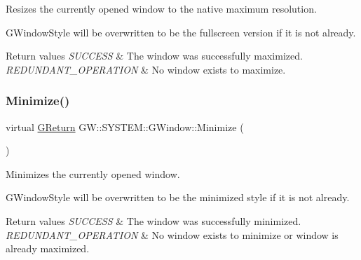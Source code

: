 Resizes the currently opened window to the native maximum resolution. 

G\+Window\+Style will be overwritten to be the fullscreen version if it is not already.


\begin{DoxyRetVals}{Return values}
{\em S\+U\+C\+C\+E\+SS} & The window was successfully maximized. \\
\hline
{\em R\+E\+D\+U\+N\+D\+A\+N\+T\+\_\+\+O\+P\+E\+R\+A\+T\+I\+ON} & No window exists to maximize. \\
\hline
\end{DoxyRetVals}
\mbox{\label{classGW_1_1SYSTEM_1_1GWindow_a2cced61a323dac10535904c3899563d8}} 
\subsubsection{\texorpdfstring{Minimize()}{Minimize()}}
{\footnotesize\ttfamily virtual \hyperlink{namespaceGW_a67a839e3df7ea8a5c5686613a7a3de21}{G\+Return} G\+W\+::\+S\+Y\+S\+T\+E\+M\+::\+G\+Window\+::\+Minimize (\begin{DoxyParamCaption}{ }\end{DoxyParamCaption})\hspace{0.3cm}{\ttfamily [pure virtual]}}



Minimizes the currently opened window. 

G\+Window\+Style will be overwritten to be the minimized style if it is not already.


\begin{DoxyRetVals}{Return values}
{\em S\+U\+C\+C\+E\+SS} & The window was successfully minimized. \\
\hline
{\em R\+E\+D\+U\+N\+D\+A\+N\+T\+\_\+\+O\+P\+E\+R\+A\+T\+I\+ON} & No window exists to minimize or window is already maximized. \\
\hline
\end{DoxyRetVals}
\mbox{\label{classGW_1_1SYSTEM_1_1GWindow_a9fc043b893f26c35e6ba965adcc17edb}} 
